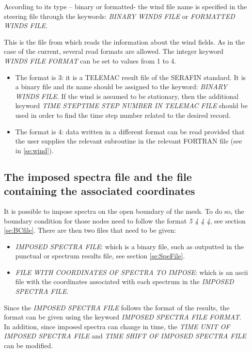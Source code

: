 According to its type -- binary or formatted- the wind file name is specified in the
steering file through the keywords: \textit{BINARY WINDS FILE }or\textit{ FORMATTED
  WINDS FILE.}

This is the file from which \tomawac reads the information about the wind fields. As
in the case of the current, several read formats are allowed. The integer keyword
\textit{WINDS FILE FORMAT} can be set to values from 1 to 4.

\begin{itemize}
\item  The format is 3: it is a TELEMAC result file of the SERAFIN standard. It is a
  binary file and its name should be assigned to the keyword: \textit{BINARY WINDS
    FILE}. If the wind is assumed to be stationary, then the additional keyword
  \textit{TIME STEPTIME STEP NUMBER IN TELEMAC FILE }should be used in order to find
  the time step number related to the desired record.
\item  The format is 4: data written in a different format can be read provided that
  the user supplies the relevant subroutine in the relevant FORTRAN file (see in
  \ref{se:wind}).
\end{itemize}

\subsection{ The imposed spectra file and the file containing the associated coordinates}
\label{se:ImpSpeCoorFiles}

It is possible to impose spectra on the open boundary of the mesh. To do so, the
boundary condition for those nodes need to follow the format \textit{5 4 4 4}, see
section \ref{se:BCfile}. There are then two files that need to be 
given:

\begin{itemize}
\item \textit{IMPOSED SPECTRA FILE}: which is a binary file, such as outputted in the
  punctual or spectrum
results file, see section \ref{se:SpeFile}.

\item \textit{FILE WITH COORDINATES OF SPECTRA TO IMPOSE}: which is an ascii file with
  the coordinates associated
with each spectrum in the \textit{IMPOSED SPECTRA FILE}.
\end{itemize}

Since the \textit{IMPOSED SPECTRA FILE} follows the format of the \telemacsystem{}
results, the format can be given using
the keyword \textit{IMPOSED SPECTRA FILE FORMAT}. In addition, since imposed spectra
can change in time, the
\textit{TIME UNIT OF IMPOSED SPECTRA FILE} and \textit{TIME SHIFT OF IMPOSED SPECTRA
  FILE} can be modified.

